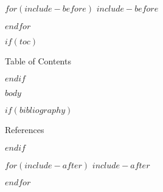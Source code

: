 \documentclass[fontset=fandol,envcountsect]{ctexbeamer}
\title$if(shorttitle)$[$shorttitle$]$endif${$title$$if(thanks)$\thanks{$thanks$}$endif$}
\subtitle$if(shortsubtitle)$[$shortsubtitle$]$endif${$subtitle$}
\author$if(shortauthor)$[$shortauthor$]$endif${$for(author)$$author$$sep$ \and $endfor$}
\date$if(shortdate)$[$shortdate$]$endif${$date$$if(date-modified)$\thanks{\transmodified \space $date-modified$.}$endif$}
\institute$if(shortinstitute)$[$shortinstitute$]$endif${$for(institute)$$institute$$sep$ \and $endfor$}
\def\transtoc{目录}
\def\transreferences{参考文献}
\def\transtoc{Table of Contents}
\def\transreferences{References}
\theoremstyle{theorem}
\theoremstyle{example}
\theoremstyle{remark}
\theoremstyle{theorem}
\theoremstyle{example}
\theoremstyle{remark}
\begin{document}
\frame{\titlepage}


$for(include-before)$
$include-before$

$endfor$

$if(toc)$
\begin{frame}{\transtoc}
  \tableofcontents
\end{frame}
$endif$

$body$

$if(bibliography)$
\begin{frame}[allowframebreaks]{\transreferences}
  \ifzh
    \printbibliography[heading=none, title={参考文献}]
  \else
    \printbibliography[heading=none]
  \fi
\end{frame}
$endif$

$for(include-after)$
$include-after$

$endfor$
\end{document}

